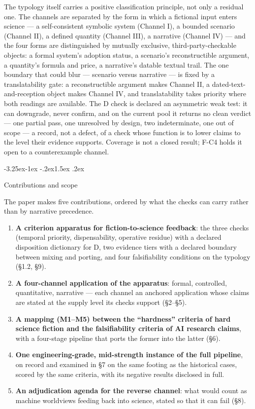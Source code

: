 \documentclass[11pt,a4paper]{article}
\makeatletter
\renewcommand\subsection{\@startsection{subsection}{2}{\z@}%
  {-3.25ex\@plus -1ex \@minus -.2ex}{1.5ex \@plus .2ex}%
  {\normalfont\large\bfseries\raggedright}}
\makeatother
\begin{document}
The typology itself carries a positive classification principle, not only a residual one. The channels are separated by the form in which a fictional input enters science — a self-consistent symbolic system (Channel I), a bounded scenario (Channel II), a defined quantity (Channel III), a narrative (Channel IV) — and the four forms are distinguished by mutually exclusive, third-party-checkable objects: a formal system's adoption status, a scenario's reconstructible argument, a quantity's formula and price, a narrative's datable textual trail. The one boundary that could blur — scenario versus narrative — is fixed by a translatability gate: a reconstructible argument makes Channel II, a dated-text-and-reception object makes Channel IV, and translatability takes priority where both readings are available. The D check is declared an asymmetric weak test: it can downgrade, never confirm, and on the current pool it returns no clean verdict — one partial pass, one unresolved by design, two indeterminate, one out of scope — a record, not a defect, of a check whose function is to lower claims to the level their evidence supports. Coverage is not a closed result; F-C4 holds it open to a counterexample channel.

\subsection{Contributions and scope}

The paper makes five contributions, ordered by what the checks can carry rather than by narrative precedence.

\begin{enumerate}[leftmargin=1.6em,itemsep=2pt,parsep=0pt,topsep=3pt]
\item \textbf{A criterion apparatus for fiction-to-science feedback}: the three checks (temporal priority, dispensability, operative residue) with a declared disposition dictionary for D, two evidence tiers with a declared boundary between mixing and porting, and four falsifiability conditions on the typology (§1.2, §9).
\item \textbf{A four-channel application of the apparatus}: formal, controlled, quantitative, narrative — each channel an anchored application whose claims are stated at the supply level its checks support (§2–§5).
\item \textbf{A mapping (M1–M5) between the ``hardness'' criteria of hard science fiction and the falsifiability criteria of AI research claims}, with a four-stage pipeline that ports the former into the latter (§6).
\item \textbf{One engineering-grade, mid-strength instance of the full pipeline}, on record and examined in §7 on the same footing as the historical cases, scored by the same criteria, with its negative results disclosed in full.
\item \textbf{An adjudication agenda for the reverse channel}: what would count as machine worldviews feeding back into science, stated so that it can fail (§8).
\end{enumerate}
\end{document}

